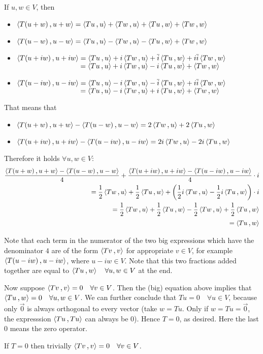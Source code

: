 \begin{prf}
  \Rightarrowdirection If $u,w \in V$, then
  \begin{itemize}
    \item $\ip{T(u+w)}{u+w} = \ip{Tu}{u} + \ip{Tw}{u} + \ip{Tu}{w} + \ip{Tw}{w}$
    \item $\ip{T(u-w)}{u-w} = \ip{Tu}{u} - \ip{Tw}{u} - \ip{Tu}{w} + \ip{Tw}{w}$
    \item $\ip{T(u+iw)}{u+iw} = \ip{Tu}{u} + i\ip{Tw}{u} + \overline i \ip{Tu}{w} + i \overline i \ip{Tw}{w}$ \\
    $\phantom{\ip{T(u+iw)}{u+iw} } = \ip{Tu}{u} + i \ip{Tw}{u} - i\ip{Tu}{w} + \ip{Tw}{w}$
    \item $\ip{T(u-iw)}{u-iw} = \ip{Tu}{u} - i\ip{Tw}{u} - \overline i \ip{Tu}{w} + i \overline i \ip{Tw}{w}$ \\
    $\phantom{\ip{T(u+iw)}{u+iw} } = \ip{Tu}{u} - i \ip{Tw}{u} + i\ip{Tu}{w} + \ip{Tw}{w}$
  \end{itemize}

  That means that
  \begin{itemize}
    \item $\ip{T(u+w)}{u+w} - \ip{T(u-w)}{u-w} = 2 \ip{Tw}{u} + 2 \ip{Tu}{w}$
    \item $\ip{T(u+iw)}{u+iw} - \ip{T(u-iw)}{u-iw} = 2i \ip{Tw}{u} - 2i\ip{Tu}{w}$
  \end{itemize}

  Therefore it holds $\forall u,w \in V$:
  \setlength{\abovedisplayskip}{0.6em}
  \[
  \begin{aligned}
      \frac{\ip{T(u+w)}{u+w} - \ip{T(u-w)}{u-w}}{4}
    +
    \frac{\ip{T(u+iw)}{u+iw} - \ip{T(u-iw)}{u-iw}}{4} \cdot i \\
    = \frac{1}{2} \ip{Tw}{u} + \frac{1}{2} \ip{Tu}{w} + \left(\frac{1}{2}i \ip{Tw}{u} - \frac{1}{2}i\ip{Tu}{w} \right)\cdot i \\
    = \frac{1}{2} \ip{Tw}{u} + \frac{1}{2} \ip{Tu}{w} - \frac{1}{2} \ip{Tw}{u} + \frac{1}{2}\ip{Tu}{w} \\
    = \ip{Tu}{w}
  \end{aligned}
  \]
  \setlength{\abovedisplayskip}{0em} %

  Note that each term in the numerator of the two big expressions which have the denominator $4$ are of the form $\ip{Tv}{v}$ for appropriate $v \in V$, for example $\ip{T(u-iw)}{u-iw}$, where $u-iw \in V$. Note that this two fractions added together are equal to $\ip{Tu}{w} \quad \forall u,w \in V$ at the end.

  Now suppose $\ip{Tv}{v} = 0 \quad \forall v \in V$. Then the (big) equation above implies that $\ip{Tu}{w} = 0 \quad \forall u, w \in V$.
  We can further conclude that $Tu=0 \quad \forall u \in V$, because only $\vec 0$ is always orthogonal to every vector (take $w=Tu$. Only if $w=Tu=\vec 0$, the expresssion $\ip{Tu}{Tu}$ can always  be $0$). Hence $T=0$, as desired. Here the last $0$ means the zero operator.

  \Leftarrowdirection If $T = 0$ then trivially $\ip{Tv}{v}=0 \quad \forall v \in V$.
\end{prf}

